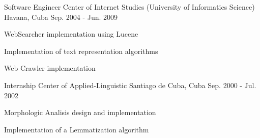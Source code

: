 \begin{cventries}
\cventry
{Software Engineer} %
{Center of Internet Studies (University of Informatics Science)} %
{Havana, Cuba} %
{Sep. 2004 - Jun. 2009} %
{ %
\begin{cvitems}
\item {WebSearcher implementation using Lucene}
\item {Implementation of text representation algorithms}
\item {Web Crawler implementation}
\end{cvitems}
}


\cventry
{Internship} %
{Center of Applied-Linguistic} %
{Santiago de Cuba, Cuba} %
{Sep. 2000 - Jul. 2002} %
{ %
\begin{cvitems}
\item {Morphologic Analisis design and implementation}
\item {Implementation of a Lemmatization algorithm}
\end{cvitems}
}


\end{cventries}
